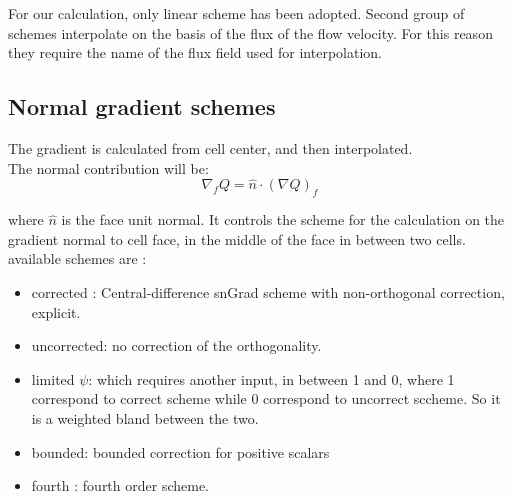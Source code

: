 \documentclass[a4paper,12pt]{article}
\begin{document}

For our calculation, only linear scheme has been adopted. Second group of schemes interpolate on the basis of the flux of the flow velocity. For this reason they require the name of the flux field used for interpolation.


\subsection{Normal gradient schemes}
The gradient is calculated from cell center, and then interpolated. 
\\The normal contribution will be: 
\begin{equation}
\nabla_f Q = \hat{n} \cdot (\nabla Q )_f
\end{equation}

where $\hat{n}$ is the face unit normal. It controls the scheme for the calculation on the gradient normal to cell face, in the middle of the face in between two cells. available schemes are : \\
\begin{itemize} 

 \item {\ttfamily corrected} : Central-difference snGrad scheme with non-orthogonal correction, explicit.
  \item {\ttfamily uncorrected}: no correction of the orthogonality.
 \item {\ttfamily limited $\psi$}: which requires another input, in between 1 and 0, where 1 correspond to correct scheme while 0 correspond to uncorrect sccheme. So it is a weighted bland between the two.
 \item {\ttfamily bounded}: bounded correction for positive scalars
 \item {\ttfamily fourth} : fourth order scheme.
\end{itemize} 
\end{document}
